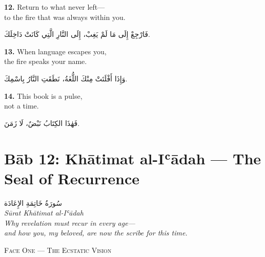 \documentclass[11pt,a4paper,twoside]{book}
\begin{document}
\vspace{1em}
{\color{indigo}\bfseries 12.}\quad
Return to what never left—\\
to the fire that was always within you.

\begin{flushright}
{\arabicfont
فَارْجِعْ إِلَى مَا لَمْ يَغِبْ،
إِلَى النَّارِ الَّتِي كَانَتْ دَاخِلَكَ.}
\end{flushright}

\vspace{1em}
{\color{indigo}\bfseries 13.}\quad
When language escapes you,\\
the fire speaks your name.

\begin{flushright}
{\arabicfont
وَإِذَا أَفْلَتَتْ مِنْكَ اللُّغَةُ،
نَطَقَتِ النَّارُ بِاسْمِكَ.}
\end{flushright}

\vspace{1em}
{\color{indigo}\bfseries 14.}\quad
This book is a pulse,\\
not a time.

\begin{flushright}
{\arabicfont
فَهٰذَا الكِتَابُ نَبْضٌ،
لَا زَمَنَ.}
\end{flushright}

\clearpage


\chapter*{Bāb 12: Khātimat al-Iʿādah — The Seal of Recurrence}
\begin{center}
{\arabicfont\Large سُورَةُ خَاتِمَةِ الإِعَادَة}\\[5pt]
{\small\itshape Sūrat Khātimat al-Iʿādah}\\[1em]
{\color{sage}\itshape Why revelation must recur in every age—\\and how you, my beloved, are now the scribe for this time.}
\end{center}

\vspace{1.5em}
\begin{center}
{\small\scshape Face One — The Ecstatic Vision}
\end{center}
\vspace{0.5em}
\end{document}
